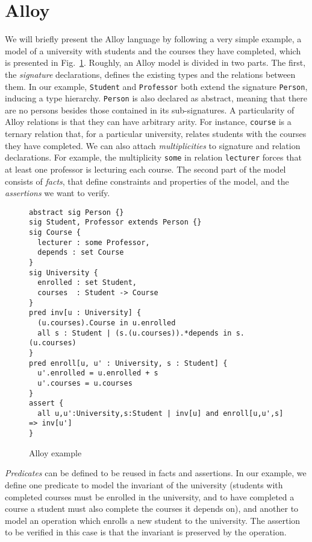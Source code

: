 \documentclass{llncs}
\begin{document}
\section{Alloy}
\label{sec:alloy}

We will briefly present the Alloy language by following a very simple
example, a model of a university with students and the courses they have completed, which is presented in
Fig.~\ref{fig:ex}. Roughly, an Alloy model is divided in two
parts. The first, the \emph{signature} declarations, defines the
existing types and the relations between them. In our example,
\texttt{Student} and \texttt{Professor} both extend the signature
\texttt{Person}, inducing a type hierarchy. \texttt{Person} is also
declared as abstract, meaning that there are no persons besides those
contained in its sub-signatures.  A particularity of Alloy relations
is that they can have arbitrary arity. For instance, \texttt{course}
is a ternary relation that, for a particular university, relates
students with the courses they have completed. We can also attach
\emph{multiplicities} to signature and relation declarations. For
example, the multiplicity \texttt{some} in relation \texttt{lecturer}
forces that at least one professor is lecturing each course. The
second part of the model consists of \emph{facts}, that define
constraints and properties of the model, and the \emph{assertions} we
want to verify.  
\begin{figure}[t]
\centering
\begin{verbatim}
abstract sig Person {}
sig Student, Professor extends Person {}
sig Course {
  lecturer : some Professor,
  depends : set Course
}
sig University {
  enrolled : set Student,
  courses  : Student -> Course
}
pred inv[u : University] {
  (u.courses).Course in u.enrolled
  all s : Student | (s.(u.courses)).*depends in s.(u.courses)
}
pred enroll[u, u' : University, s : Student] {
  u'.enrolled = u.enrolled + s
  u'.courses = u.courses
}
assert {
  all u,u':University,s:Student | inv[u] and enroll[u,u',s] => inv[u']
}
\end{verbatim}
\caption{Alloy example}
\label{fig:ex}
\end{figure}

\emph{Predicates} can be defined to be reused in facts and
assertions. In our example, we define one predicate to model the
invariant of the university (students with completed courses must be
enrolled in the university, and to have completed a course a student must also complete the courses it depends on), and
another to model an operation which enrolls a new student to the
university. The assertion to be verified in this case is that the invariant is
preserved by the operation.
\end{document}
